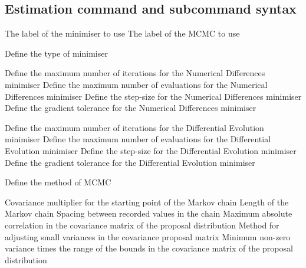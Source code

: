 \subsection{Estimation command and subcommand syntax}
\par
{}
 {The label of the minimiser to use}
 {The label of the MCMC to use}
\par {}\par
{} {Define the type of minimiser}
\par\textbf{}\par
{} {Define the maximum number of iterations for the Numerical Differences minimiser}
 {Define the maximum number of evaluations for the Numerical Differences minimiser}
 {Define the step-size for the Numerical Differences minimiser}
 {Define the gradient tolerance for the Numerical Differences minimiser}
\par\textbf{}\par
{} {Define the maximum number of iterations for the Differential Evolution minimiser}
 {Define the maximum number of evaluations for the Differential Evolution minimiser}
 {Define the step-size for the Differential Evolution minimiser}
 {Define the gradient tolerance for the Differential Evolution minimiser}
\par {}\par
{} {Define the method of MCMC}
\par\textbf{}\par
{} {Covariance multiplier for the starting point of the Markov chain}
 {Length of the Markov chain}
 {Spacing between recorded values in the chain}
 {Maximum absolute correlation in the covariance matrix of the proposal distribution}
 {Method for adjusting small variances in the covariance proposal matrix}
 {Minimum non-zero variance times the range of the bounds in the covariance matrix of the proposal distribution}
